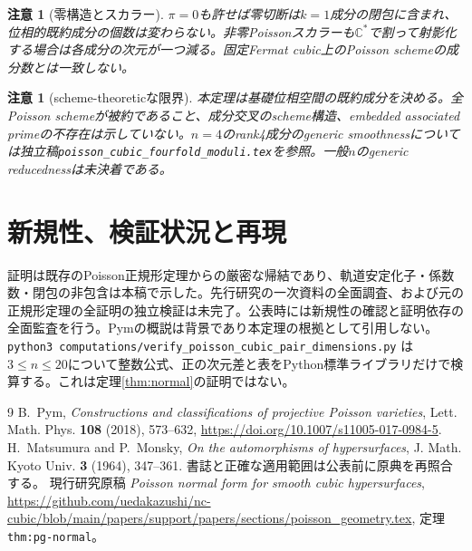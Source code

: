 \documentclass[11pt,a4paper]{ltjsarticle}
\newtheorem{remark}[theorem]{注意}
\newcommand{\C}{\mathbb C}
\begin{document}
\begin{remark}[零構造とスカラー]
$\pi=0$も許せば零切断は$k=1$成分の閉包に含まれ、位相的既約成分の個数は変わらない。非零Poissonスカラーも$\C^*$で割って射影化する場合は各成分の次元が一つ減る。固定Fermat cubic上のPoisson schemeの成分数とは一致しない。
\end{remark}
\begin{remark}[scheme-theoreticな限界]
本定理は基礎位相空間の既約成分を決める。全Poisson schemeが被約であること、成分交叉のscheme構造、embedded associated primeの不存在は示していない。$n=4$のrank4成分のgeneric smoothnessについては独立稿\texttt{poisson\_cubic\_fourfold\_moduli.tex}を参照。一般$n$のgeneric reducednessは未決着である。
\end{remark}
\section{新規性、検証状況と再現}
証明は既存のPoisson正規形定理からの厳密な帰結であり、軌道安定化子・係数数・閉包の非包含は本稿で示した。先行研究の一次資料の全面調査、および元の正規形定理の全証明の独立検証は未完了。公表時には新規性の確認と証明依存の全面監査を行う。Pymの概説は背景であり本定理の根拠として引用しない。
\texttt{python3 computations/verify\_poisson\_cubic\_pair\_dimensions.py} は$3\le n\le20$について整数公式、正の次元差と表をPython標準ライブラリだけで検算する。これは定理\ref{thm:normal}の証明ではない。
\begin{thebibliography}{9}
 B.~Pym, \emph{Constructions and classifications of projective Poisson varieties}, Lett. Math. Phys. \textbf{108} (2018), 573--632, \url{https://doi.org/10.1007/s11005-017-0984-5}.
 H.~Matsumura and P.~Monsky, \emph{On the automorphisms of hypersurfaces}, J. Math. Kyoto Univ. \textbf{3} (1964), 347--361. 書誌と正確な適用範囲は公表前に原典を再照合する。
 現行研究原稿 \emph{Poisson normal form for smooth cubic hypersurfaces}, \url{https://github.com/uedakazushi/nc-cubic/blob/main/papers/support/papers/sections/poisson_geometry.tex}, 定理\texttt{thm:pg-normal}。
\end{thebibliography}
\end{document}
